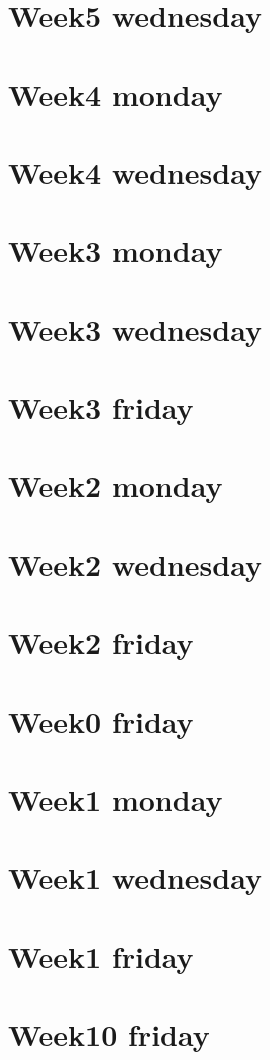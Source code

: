 
\section*{Week5 wednesday}

\vfill
\section*{Week4 monday}

\vfill
\section*{Week4 wednesday}

\vfill
\section*{Week3 monday}

\vfill
\section*{Week3 wednesday}

\vfill
\section*{Week3 friday}

\vfill
\section*{Week2 monday}

\vfill
\section*{Week2 wednesday}

\vfill
\section*{Week2 friday}

\vfill
\section*{Week0 friday}

\vfill
\section*{Week1 monday}

\vfill
\section*{Week1 wednesday}

\vfill
\section*{Week1 friday}

\vfill
\section*{Week10 friday}

\vfill
